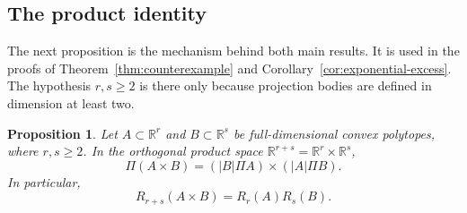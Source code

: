 \documentclass[11pt]{article}
\newtheorem{proposition}[theorem]{Proposition}
\newcommand{\R}{\mathbb R}
\begin{document}
\subsection{The product identity}

The next proposition is the mechanism behind both main results. It is used
in the proofs of Theorem~\ref{thm:counterexample} and
Corollary~\ref{cor:exponential-excess}. The hypothesis \(r,s\ge2\) is there
only because projection bodies are defined in dimension at least two.

\begin{proposition}\label{prop:product}
Let \(A\subset\R^r\) and \(B\subset\R^s\) be full-dimensional convex
polytopes, where \(r,s\ge2\). In the orthogonal product space
\(\R^{r+s}=\R^r\times\R^s\),
\begin{equation}\label{eq:product-body}
 \Pi(A\times B)=(|B|\Pi A)\times(|A|\Pi B).
\end{equation}
In particular,
\begin{equation}\label{eq:multiplicative}
 R_{r+s}(A\times B)=R_r(A)R_s(B).
\end{equation}
\end{proposition}
\end{document}
